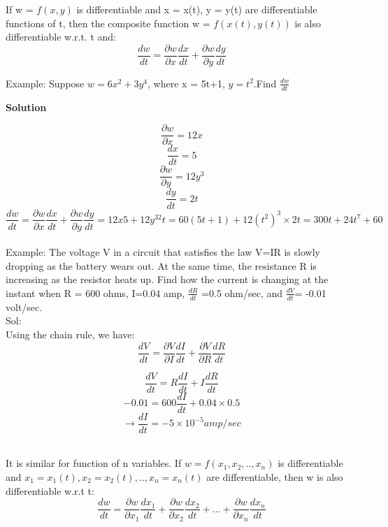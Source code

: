\documentclass[12pt]{article}
\begin{document}
\begin{mybox}
    If w = $f(x, y)$ is differentiable and x = x(t), y = y(t) are differentiable functions of t, then the composite function w = $f(
x(t), y(t))$ is also differentiable w.r.t. t and:
$$\frac{dw}{dt} = \frac{\partial w}{\partial x} \frac{dx}{dt}+ \frac{\partial w}{\partial y} \frac{dy}{dt}$$
\end{mybox}
 Example: Suppose $w = 6x^2+3y^4$, where x = 5t+1, $y = t^2$.Find $\frac{dw}{dt}$ 
 \begin{center}
     \textbf{Solution}
 \end{center}
 $$\frac{\partial w}{\partial x} = 12x$$
 $$\frac{dx}{dt}=5$$
 $$\frac{\partial w}{\partial y} = 12y^3$$
 $$\frac{dy}{dt} = 2t$$
 $$\frac{dw}{dt} = \frac{\partial w}{\partial x} \frac{dx}{dt}+ \frac{\partial w}{\partial y} \frac{dy}{dt} = 12x5 + 12y^32t = 60(5t+1) + 12(t^2)^3 \times 2t = 300t+24t^7+60$$
\\
 Example: The voltage V in a circuit that 
satisfies the law V=IR is slowly dropping as the battery wears 
out. At the same time, the resistance R is increasing as the resistor 
heats up. Find how the current is changing at the instant when R = 
600 ohms, I=0.04 amp, $\frac{dR}{dt}$ =0.5 ohm/sec, and $\frac{dV}{dt}$= -0.01 volt/sec.\\
Sol:\\
Using the chain rule, we have:\\
$$\frac{dV}{dt} = \frac{\partial V}{\partial I}\frac{dI}{dt} + \frac{\partial V}{\partial R}\frac{dR}{dt}$$

$$\frac{dV}{dt} = R\frac{dI}{dt} + I\frac{dR}{dt}$$
$$-0.01 = 600\frac{dI}{dt}+0.04\times0.5$$
$$\rightarrow \frac{dI}{dt} = -5\times10^{-5} amp/sec$$
\\

\begin{mybox}
    It is similar for function of n variables. If $w = f(x_1,x_2,..,x_n)$ is differentiable and $x_1 = x_1(t), x_2 =x_2(t),..,x_n = x_n(t)$ are differentiable, then w is also differentiable w.r.t t:
    $$\frac{dw}{dt}=\frac{\partial w}{\partial x_1}\frac{dx_1}{dt}+ \frac{\partial w}{\partial x_2}\frac{dx_2}{dt}+...+\frac{\partial w}{\partial x_n}\frac{dx_n}{dt} $$
\end{mybox}
\end{document}
